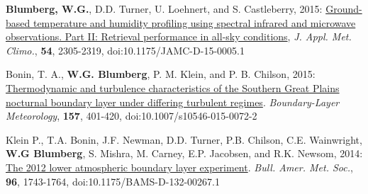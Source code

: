 \begin{cvparagraph}
    \textbf{Blumberg, W.G.}, D.D. Turner, U. Loehnert, and S. Castleberry, 2015: \href{http://journals.ametsoc.org/doi/abs/10.1175/JAMC-D-15-0005.1}{Ground-based temperature and humidity profiling using spectral infrared and microwave observations.  Part II: Retrieval performance in all-sky conditions}, \emph{J. Appl. Met. Climo.}, \textbf{54}, 2305-2319, doi:10.1175/JAMC-D-15-0005.1
    
    Bonin, T. A., \textbf{W.G. Blumberg}, P. M. Klein, and P. B. Chilson, 2015: \href{http://link.springer.com/article/10.1007/s10546-015-0072-2}{Thermodynamic and turbulence characteristics of the Southern Great Plains nocturnal boundary layer under differing turbulent regimes}. \emph{Boundary-Layer Meteorology}, \textbf{157}, 401-420, doi:10.1007/s10546-015-0072-2
    
    Klein P., T.A. Bonin, J.F. Newman,  D.D. Turner, P.B. Chilson, C.E. Wainwright, \textbf{W.G Blumberg}, S. Mishra, M. Carney,  E.P. Jacobsen, and R.K. Newsom, 2014: \href{http://journals.ametsoc.org/doi/abs/10.1175/BAMS-D-13-00267.1}{The 2012 lower atmospheric boundary layer experiment}. \emph{Bull. Amer. Met. Soc.}, \textbf{96}, 1743-1764, doi:10.1175/BAMS-D-132-00267.1
\end{cvparagraph}
